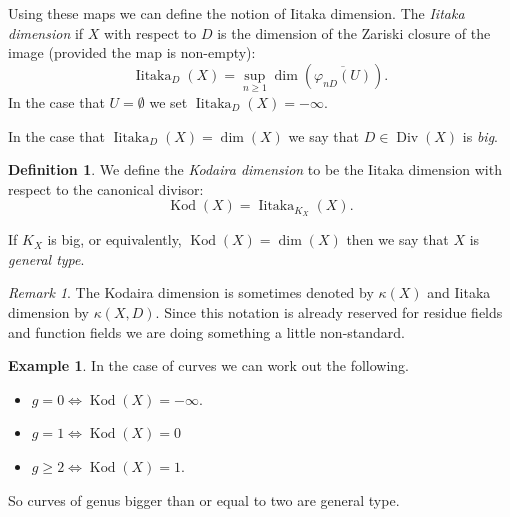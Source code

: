 \documentclass[12pt]{article}
\numberwithin{equation}{section}
\theoremstyle{definition}
\newtheorem{definition}[theorem]{Definition}
\newtheorem{example}[theorem]{Example}
\theoremstyle{remark}
\newtheorem{remark}[theorem]{Remark}
\newcommand{\Div}{\operatorname{Div}}
\newcommand{\kod}{\operatorname{Kod}}
\newcommand{\iitaka}{\operatorname{Iitaka}}
\begin{document}
Using these maps we can define the notion of Iitaka dimension.
The \emph{Iitaka dimension} if $X$ with respect to $D$ is the dimension of the Zariski closure of the image (provided the map is non-empty):
$$\iitaka_D(X) = \sup_{n\geq 1} \dim( \overline{\varphi_{nD}(U)} ). $$
In the case that $U = \emptyset$ we set $\iitaka_D(X) = -\infty$.

In the case that $\iitaka_D(X)=\dim(X)$ we say that $D\in \Div(X)$ is \emph{big}.

\begin{definition}
	We define the \emph{Kodaira dimension} to be the Iitaka dimension with respect to the canonical divisor:
	 $$ \kod(X) = \iitaka_{K_X}(X).$$
\end{definition}

If $K_X$ is big, or equivalently, $\kod(X)=\dim(X)$ then we say that $X$ is \emph{general type}.

\begin{remark}
	The Kodaira dimension is sometimes denoted by $\kappa(X)$ and Iitaka dimension by $\kappa(X,D)$. 
	Since this notation is already reserved for residue fields and function fields we are doing something a little non-standard.
\end{remark}


\begin{example}
	In the case of curves we can work out the following.
	\begin{itemize}
		\item $g=0 \iff \kod(X)=-\infty$.
		\item $g=1 \iff \kod(X)=0$
		\item $g\geq 2 \iff \kod(X) =1$.
	\end{itemize}
So curves of genus bigger than or equal to two are general type. 
\end{example}
\end{document}

